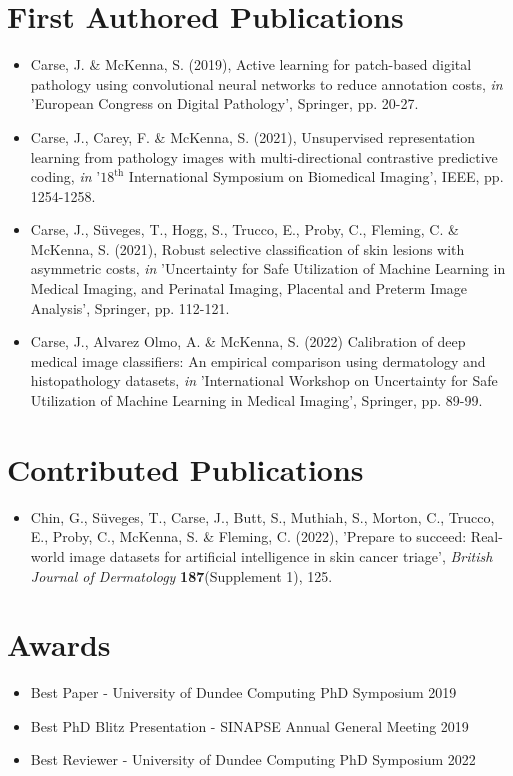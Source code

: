 \section{First Authored Publications}
\label{sec:first_authored_publications}

\begin{itemize}
	\item Carse, J. \& McKenna, S. (2019), Active learning for patch-based digital pathology using convolutional neural networks to reduce annotation costs, \textit{in} 'European Congress on Digital Pathology', Springer, pp. 20-27. 
	
	\item Carse, J., Carey, F. \&  McKenna, S. (2021), Unsupervised representation learning from pathology images with multi-directional contrastive predictive coding, \textit{in} '$18^{\text{th}}$ International Symposium on Biomedical Imaging', IEEE, pp. 1254-1258.
	
	\item Carse, J., S\"{u}veges, T., Hogg, S., Trucco, E., Proby, C., Fleming, C. \& McKenna, S. (2021), Robust selective classification of skin lesions with asymmetric costs, \textit{in} 'Uncertainty for Safe Utilization of Machine Learning in Medical Imaging, and Perinatal Imaging, Placental and Preterm Image Analysis', Springer, pp. 112-121.
	
	\item Carse, J., Alvarez Olmo, A. \& McKenna, S. (2022) Calibration of deep medical image classifiers: An empirical comparison using dermatology and histopathology datasets, \textit{in} 'International Workshop on Uncertainty for Safe Utilization of Machine Learning in Medical Imaging', Springer, pp. 89-99.
\end{itemize}



\section{Contributed Publications}
\label{sec:contributed_publications}

\begin{itemize}
	\item Chin, G.,  S\"{u}veges, T., Carse, J., Butt, S., Muthiah, S., Morton, C., Trucco, E., Proby, C., McKenna, S. \& Fleming, C. (2022), 'Prepare to succeed: Real-world image datasets for artificial intelligence in skin cancer triage', \textit{British Journal of Dermatology} \textbf{187}(Supplement 1), 125.
\end{itemize}



\section{Awards}
\label{sec:awards}

\begin{itemize}
	\item Best Paper - University of Dundee Computing PhD Symposium 2019
	\item Best PhD Blitz Presentation - SINAPSE Annual General Meeting 2019
	\item Best Reviewer - University of Dundee Computing PhD Symposium 2022
\end{itemize}